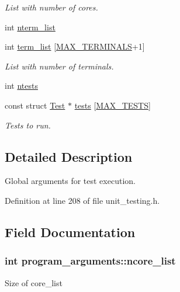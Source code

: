 \begin{DoxyCompactItemize}
\begin{DoxyCompactList}\small\item\em List with number of cores. \end{DoxyCompactList}\item 
int \hyperlink{structprogram__arguments_a48fbd16e4ce7ab5438078817c4931108}{nterm\-\_\-list}
\item 
\hypertarget{structprogram__arguments_ab05abd5478458bb551479eb3e3dc75b1}{int \hyperlink{structprogram__arguments_ab05abd5478458bb551479eb3e3dc75b1}{term\-\_\-list} \mbox{[}\hyperlink{bios_8h_a4e7d162c7c35103b42768ff4a5c73905}{M\-A\-X\-\_\-\-T\-E\-R\-M\-I\-N\-A\-L\-S}+1\mbox{]}}\label{structprogram__arguments_ab05abd5478458bb551479eb3e3dc75b1}

\begin{DoxyCompactList}\small\item\em List with number of terminals. \end{DoxyCompactList}\item 
int \hyperlink{structprogram__arguments_a8b96bf14afced6bae0d45424ab2fac57}{ntests}
\item 
\hypertarget{structprogram__arguments_a1db9e2ccc5b4309d559617d2b327e527}{const struct \hyperlink{structTest}{Test} $\ast$ \hyperlink{structprogram__arguments_a1db9e2ccc5b4309d559617d2b327e527}{tests} \mbox{[}\hyperlink{group__Testing_ga2a77d2f2c5b698c69c19e1f8782bf709}{M\-A\-X\-\_\-\-T\-E\-S\-T\-S}\mbox{]}}\label{structprogram__arguments_a1db9e2ccc5b4309d559617d2b327e527}

\begin{DoxyCompactList}\small\item\em Tests to run. \end{DoxyCompactList}\end{DoxyCompactItemize}


\subsection{Detailed Description}
Global arguments for test execution. 

Definition at line 208 of file unit\-\_\-testing.\-h.



\subsection{Field Documentation}
\hypertarget{structprogram__arguments_ab9717e16b92f14aa8c54dbf4a2d2b7b1}{
\subsubsection[{ncore\-\_\-list}]{\setlength{\rightskip}{0pt plus 5cm}int program\-\_\-arguments\-::ncore\-\_\-list}}\label{structprogram__arguments_ab9717e16b92f14aa8c54dbf4a2d2b7b1}
Size of {\ttfamily core\-\_\-list} 

